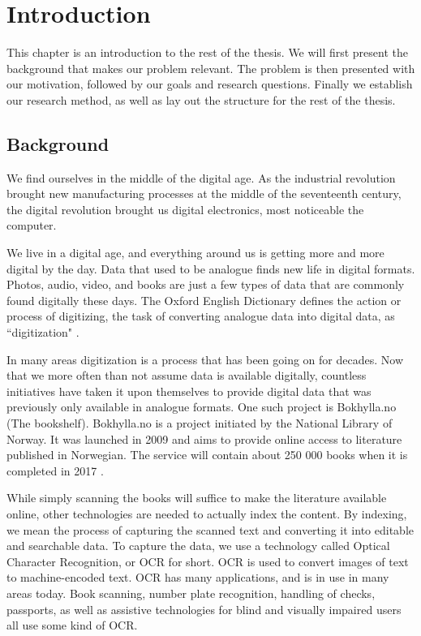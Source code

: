 
\chapter{Introduction}
\label{ch:introduction}
This chapter is an introduction to the rest of the thesis. We will first present the background that makes our problem relevant. The problem is then presented with our motivation, followed by our goals and research questions. Finally we establish our research method, as well as lay out the structure for the rest of the thesis.


\section{Background}
We find ourselves in the middle of the digital age. As the industrial revolution brought new manufacturing processes at the middle of the seventeenth century, the digital revolution brought us digital electronics, most noticeable the computer.

We live in a digital age, and everything around us is getting more and more digital by the day. Data that used to be analogue finds new life in digital formats. Photos, audio, video, and books are just a few types of data that are commonly found digitally these days. The Oxford English Dictionary defines the action or process of digitizing, the task of converting analogue data into digital data, as ``digitization" \cite{misc-oed-digitization}.

In many areas digitization is a process that has been going on for decades. Now that we more often than not assume data is available digitally, countless initiatives have taken it upon themselves to provide digital data that was previously only available in analogue formats. One such project is Bokhylla.no (The bookshelf). Bokhylla.no is a project initiated by the National Library of Norway. It was launched in 2009 and aims to provide online access to literature published in Norwegian. The service will contain about 250 000 books when it is completed in 2017 \cite{misc-nb-digial-library}.

While simply scanning the books will suffice to make the literature available online, other technologies are needed to actually index the content. By indexing, we mean the process of capturing the scanned text and converting it into editable and searchable data. To capture the data, we use a technology called Optical Character Recognition, or OCR for short. OCR is used to convert images of text to machine-encoded text. OCR has many applications, and is in use in many areas today. Book scanning, number plate recognition, handling of checks, passports, as well as assistive technologies for blind and visually impaired users all use some kind of OCR.

